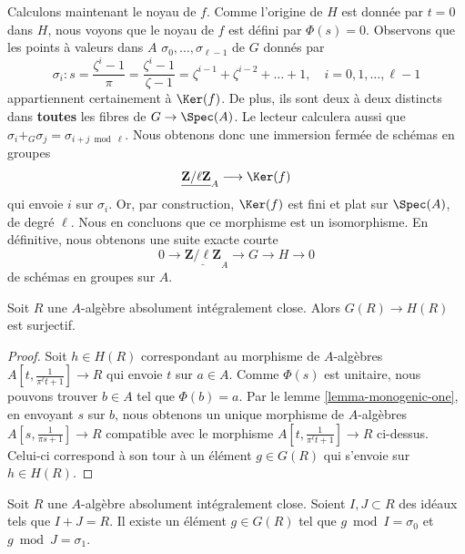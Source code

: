 \noindent
Calculons maintenant le noyau de $f$. Comme l'origine de $H$ est
donnée par $t = 0$ dans $H$, nous voyons que le noyau de $f$ est défini
par $\Phi(s) = 0$. Observons que les points à valeurs dans $A$
$\sigma_0, \ldots, \sigma_{\ell - 1}$
de $G$ donnés par
$$
\sigma_i :
s = \frac{\zeta^i - 1}{\pi} = \frac{\zeta^i - 1}{\zeta - 1} =
\zeta^{i - 1} + \zeta^{i - 2} + \ldots + 1,\quad
i = 0, 1, \ldots, \ell - 1
$$
appartiennent certainement à $\Ker(f)$. De plus, ils sont deux à deux
distincts dans {\bf toutes} les fibres de $G \to \Spec(A)$. Le lecteur
calculera aussi que $\sigma_i +_G \sigma_j = \sigma_{i + j \bmod \ell}$.
Nous obtenons donc une immersion fermée de schémas en groupes
$$
\underline{\mathbf{Z}/\ell \mathbf{Z}}_A \longrightarrow \Ker(f)
$$
qui envoie $i$ sur $\sigma_i$. Or, par construction, $\Ker(f)$
est fini et plat sur $\Spec(A)$, de degré $\ell$. Nous en concluons
que ce morphisme est un isomorphisme. En définitive, nous obtenons
une suite exacte courte
\begin{equation}
\label{equation-ses}
0 \to
\underline{\mathbf{Z}/\ell \mathbf{Z}}_A
\to G
\to H
\to 0
\end{equation}
de schémas en groupes sur $A$.

\begin{lemma}
\label{lemma-lift-points-H-to-G}
Soit $R$ une $A$-algèbre absolument intégralement close. Alors
$G(R) \to H(R)$ est surjectif.
\end{lemma}

\begin{proof}
Soit $h \in H(R)$ correspondant au morphisme de $A$-algèbres
$A[t, \frac{1}{\pi^\ell t + 1}] \to R$ qui envoie $t$ sur $a \in A$.
Comme $\Phi(s)$ est unitaire, nous pouvons trouver $b \in A$
tel que $\Phi(b) = a$. Par le lemme \ref{lemma-monogenic-one},
en envoyant $s$ sur $b$, nous obtenons un unique morphisme de $A$-algèbres
$A[s, \frac{1}{\pi s + 1}] \to R$ compatible
avec le morphisme $A[t, \frac{1}{\pi^\ell t + 1}] \to R$ ci-dessus.
Celui-ci correspond à son tour à un élément $g \in G(R)$
qui s'envoie sur $h \in H(R)$.
\end{proof}

\begin{lemma}
\label{lemma-interpolate}
Soit $R$ une $A$-algèbre absolument intégralement close.
Soient $I, J \subset R$ des idéaux tels que $I + J = R$.
Il existe un élément $g \in G(R)$ tel
que $g \bmod I = \sigma_0$ et $g \bmod J = \sigma_1$.
\end{lemma}

